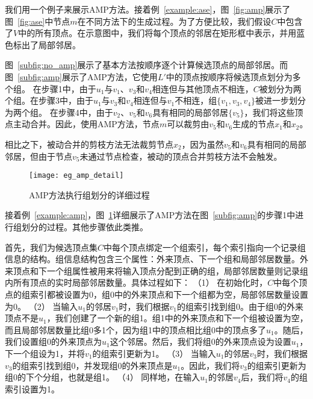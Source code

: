 \begin{example}
  我们用一个例子来展示AMP方法。接着例~\ref{example:ase}，图~\ref{fig:amp}展示了图~\ref{fig:ase}中节点$m$在不同方法下的生成过程。为了方便比较，我们假设$C$中包含了$V$中的所有顶点。在示意图中，我们将每个顶点的邻居在矩形框中表示，并用蓝色标出了局部邻居。

  图~\ref{subfig:no_amp}展示了基本方法按顺序逐个计算候选顶点的局部邻居。而图~\ref{subfig:amp}展示了AMP方法，它使用$L'$中的顶点按顺序将候选顶点划分为多个组。  在步骤\Num1中，由于$u_1$与$v_1$、$v_3$和$v_4$相连但与其他顶点不相连，$C$被划分为两个组。在步骤\Num3中，由于$u_1$与$v_3$和$v_4$相连但与$v_1$不相连，组$\{v_1, v_3, v_4\}$被进一步划分为两个组。
在步骤\Num4中，由于$v_2$、$v_5$和$v_6$具有相同的局部邻居$\{v_5\}$，我们将这些顶点主动合并。因此，使用AMP方法，节点$m$可以裁剪由$v_5$和$v_6$生成的节点$x_1$和$x_2$。

相比之下，被动合并的剪枝方法无法裁剪节点$x_2$，因为虽然$v_5$和$v_6$具有相同的局部邻居，但由于节点$v_5$未通过节点检查，被动的顶点合并剪枝方法不会触发。

\label{example:amp}
\end{example}

\begin{figure} 
	\centering
	
  \texttt{[image: eg\_amp\_detail]}

	\caption{AMP方法执行组划分的详细过程}
	\label{fig:amp_detail}

\end{figure}

\begin{example}
  接着例~\ref{example:amp}，图~\ref{fig:amp_detail}详细展示了AMP方法在图~\ref{subfig:amp}的步骤\Num1中进行组划分的过程。其他步骤依此类推。

  首先，我们为候选顶点集$C$中每个顶点绑定一个组索引，每个索引指向一个记录组信息的结构。组信息结构包含三个属性：外来顶点、下一个组和局部邻居数量。外来顶点和下一个组属性被用来将输入顶点分配到正确的组，局部邻居数量则记录组内所有顶点的实时局部邻居数量。具体过程如下：
  （1） 在初始化时，$C$中每个顶点的组索引都被设置为0，组0中的外来顶点和下一个组都为空，局部邻居数量设置为0。
  （2） 当输入$u_1$的邻居$v_1$时，我们根据$v_1$的组索引找到组0。由于组0的外来顶点不是$u_1$，我们创建了一个新的组1。组1中的外来顶点和下一个组被设置为空，而且局部邻居数量比组0多1个，因为组1中的顶点相比组0中的顶点多了$u_1$。随后，我们设置组0的外来顶点为$u_1$	​这个邻居。然后，我们将组0的外来顶点设为设置$u_1$，下一个组设为1，并将$v_1$的组索引更新为1。
  （3） 当输入$u_1$的邻居$v_3$时，我们根据$v_3$的组索引找到组0，并发现组0的外来顶点是$u_1$。因此，我们将$v_3$的组索引更新为组0的下个分组，也就是组1。
  （4） 同样地，在输入$u_1$的邻居$v_4$后，我们将$v_4$的组索引设置为1。
  
\end{example}





